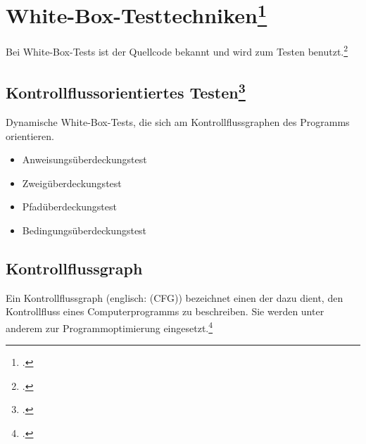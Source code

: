 \documentclass{bschlangaul-theorie}
\begin{document}
%

\section{White-Box-Testtechniken\footcite[Seite 199-246]{hoffmann:software}}

\begin{liQuellen}
\item \cite{wiki:white-box-test}
\item \cite[Seite 199-246]{hoffmann:software}
\end{liQuellen}

Bei White-Box-Tests ist der Quellcode bekannt und wird zum Testen
benutzt.\footcite[Seite 32]{sosy:fs:5}

%

\subsection{Kontrollflussorientiertes Testen\footcite[Seite 34]{sosy:fs:5}}

\begin{liQuellen}
\item \cite{wiki:kontrollfluss-test}
\item \cite[Kapitel 8.6.3 „Methoden zur Testfallermittlung“, Seite 251-252]{schneider}
\end{liQuellen}

Dynamische White-Box-Tests, die sich am Kontrollflussgraphen des
Programms orientieren.

\begin{itemize}
\item Anweisungsüberdeckungstest
\item Zweigüberdeckungstest
\item Pfadüberdeckungstest
\item Bedingungsüberdeckungstest
\end{itemize}

%

\subsection{Kontrollflussgraph}

Ein Kontrollflussgraph (englisch:  (CFG))
bezeichnet einen  der dazu dient, den
Kontrollfluss eines Computerprogramms zu beschreiben. Sie werden unter
anderem zur Programmoptimierung
eingesetzt.\footcite{wiki:kontrollflussgraph}
\end{document}
